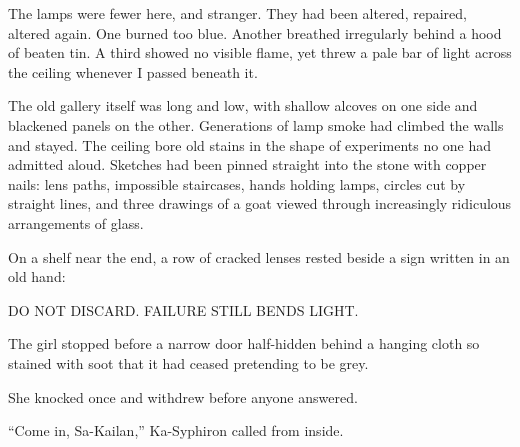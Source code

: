 The lamps were fewer here, and stranger. They had been altered, repaired, altered again. One burned too blue. Another breathed irregularly behind a hood of beaten tin. A third showed no visible flame, yet threw a pale bar of light across the ceiling whenever I passed beneath it.\par

The old gallery itself was long and low, with shallow alcoves on one side and blackened panels on the other. Generations of lamp smoke had climbed the walls and stayed. The ceiling bore old stains in the shape of experiments no one had admitted aloud. Sketches had been pinned straight into the stone with copper nails: lens paths, impossible staircases, hands holding lamps, circles cut by straight lines, and three drawings of a goat viewed through increasingly ridiculous arrangements of glass.\par

On a shelf near the end, a row of cracked lenses rested beside a sign written in an old hand:\par

\begin{scripture}
DO NOT DISCARD.
FAILURE STILL BENDS LIGHT.
\end{scripture}

The girl stopped before a narrow door half-hidden behind a hanging cloth so stained with soot that it had ceased pretending to be grey.\par

She knocked once and withdrew before anyone answered.\par

``Come in, Sa-Kailan,'' Ka-Syphiron called from inside.\par

\ornament
